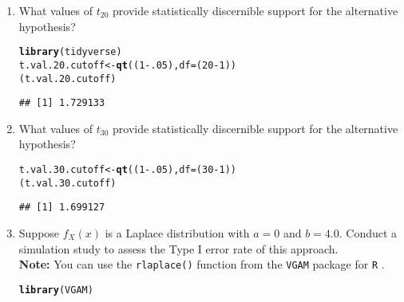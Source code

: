 \documentclass{article}\usepackage[]{graphicx}\usepackage[]{xcolor}
\makeatletter
\newcommand{\hlnum}[1]{\textcolor[rgb]{0.686,0.059,0.569}{#1}}%
\newcommand{\hlopt}[1]{\textcolor[rgb]{0,0,0}{#1}}%
\newcommand{\hldef}[1]{\textcolor[rgb]{0.345,0.345,0.345}{#1}}%
\newcommand{\hlkwb}[1]{\textcolor[rgb]{0.69,0.353,0.396}{#1}}%
\newcommand{\hlkwc}[1]{\textcolor[rgb]{0.333,0.667,0.333}{#1}}%
\newcommand{\hlkwd}[1]{\textcolor[rgb]{0.737,0.353,0.396}{\textbf{#1}}}%
\newenvironment{kframe}{%
 \def\at@end@of@kframe{}%
 \ifinner\ifhmode%
  \def\at@end@of@kframe{\end{minipage}}%
  \begin{minipage}{\columnwidth}%
 \fi\fi%
 \def\FrameCommand##1{\hskip\@totalleftmargin \hskip-\fboxsep
 \colorbox{shadecolor}{##1}\hskip-\fboxsep
     \hskip-\linewidth \hskip-\@totalleftmargin \hskip\columnwidth}%
 \MakeFramed {\advance\hsize-\width
   \@totalleftmargin\z@ \linewidth\hsize
   \@setminipage}}%
 {\par\unskip\endMakeFramed%
 \at@end@of@kframe}
\newenvironment{knitrout}{}{} %
\makeatother
\begin{document}
\begin{enumerate}
\begin{enumerate}
  \item What values of $t_{20}$ provide statistically discernible support for the
  alternative hypothesis?
\begin{knitrout}
\color{fgcolor}\begin{kframe}
\begin{alltt}
\hlkwd{library}\hldef{(tidyverse)}
\hldef{t.val.20.cutoff} \hlkwb{<-} \hlkwd{qt}\hldef{((}\hlnum{1}\hlopt{-}\hlnum{.05}\hldef{),}\hlkwc{df}\hldef{= (}\hlnum{20}\hlopt{-}\hlnum{1}\hldef{))}
\hldef{(t.val.20.cutoff)}
\end{alltt}
\begin{verbatim}
## [1] 1.729133
\end{verbatim}
\end{kframe}
\end{knitrout}
  \item What values of $t_{30}$ provide statistically discernible support for the
  alternative hypothesis?
\begin{knitrout}
\color{fgcolor}\begin{kframe}
\begin{alltt}
\hldef{t.val.30.cutoff} \hlkwb{<-} \hlkwd{qt}\hldef{((}\hlnum{1}\hlopt{-}\hlnum{.05}\hldef{),} \hlkwc{df} \hldef{= (}\hlnum{30}\hlopt{-}\hlnum{1}\hldef{))}
\hldef{(t.val.30.cutoff)}
\end{alltt}
\begin{verbatim}
## [1] 1.699127
\end{verbatim}
\end{kframe}
\end{knitrout}
  \item Suppose $f_X(x)$ is a Laplace distribution with $a=0$ and $b=4.0$.
  Conduct a simulation study to assess the Type I error rate of this approach.\\
  \textbf{Note:} You can use the \texttt{rlaplace()} function from the \texttt{VGAM}
  package for \texttt{R} \citep{VGAM}.
\begin{knitrout}
\color{fgcolor}\begin{kframe}
\begin{alltt}
\hlkwd{library}\hldef{(VGAM)}
\end{alltt}


{\ttfamily\noindent\itshape\color{messagecolor}{\#\# Loading required package: stats4}}


\end{kframe}
\end{knitrout}
\end{enumerate}
\end{enumerate}
\end{document}
